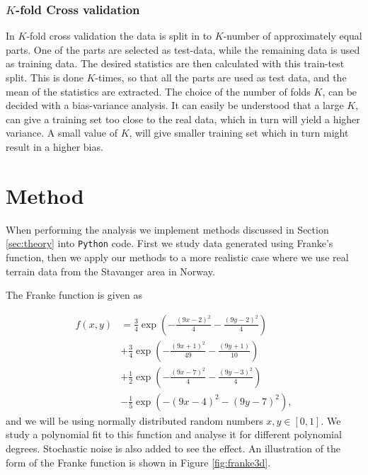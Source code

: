 \documentclass[norsk,a4paper,12pt]{article}
\begin{document}
\begin{multicols}{2}
\subsubsection{$K$-fold Cross validation}
In $K$-fold cross validation the data is split in to $K$-number of approximately equal parts. One of the parts are selected as test-data, while the remaining data is used as training data. The desired statistics are then calculated with this train-test split. This is done $K$-times, so that all the parts are used as test data, and the mean of the statistics are extracted. The choice of the number of folds $K$, can be decided with a bias-variance analysis. It can easily be understood that a large $K$, can give a training set too close to the real data, which in turn will yield a higher variance. A small value of $K$, will give smaller training set which in turn might result in a higher bias.


\section{Method}\label{sec:meth}
When performing the analysis we implement methods discussed in Section \ref{sec:theory} into \texttt{Python} code. First we study data generated using Franke's function, then we apply our methods to a more realistic case where we use real terrain data from the Stavanger area in Norway.

The Franke function is given as

\begin{equation}
\begin{split}
    f(x,y) & = \frac{3}{4} \exp(-\frac{(9x - 2)^2}{4} - \frac{(9y - 2)^2}{4}) \\ &+ \frac{3}{4} \exp(-\frac{(9x + 1)^2}{49} - \frac{(9y + 1)}{10}) \\ &+ \frac{1}{2} \exp(-\frac{(9x - 7)^2}{4} - \frac{(9y - 3)^2}{4}) \\ & - \frac{1}{5} \exp(-(9x - 4)^2 - (9 y - 7)^2),
\end{split}
    \label{eq:franke}
\end{equation}
and we will be using normally distributed random numbers $x, y \in [0,1]$. We study a polynomial fit to this function and analyse it for different polynomial degrees. Stochastic noise is also added to see the effect. An illustration of the form of the Franke function is shown in Figure \ref{fig:franke3d}.


\end{multicols}
\end{document}
